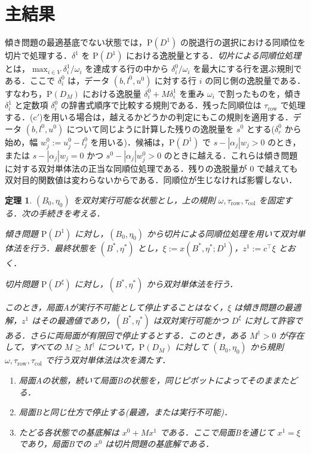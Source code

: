 \documentclass[11pt,a4paper]{ltjsarticle}
\theoremstyle{plain}
\newtheorem{theorem}{定理}
\theoremstyle{definition}
\theoremstyle{remark}
\newcommand{\Pb}{\mathrm{P}}
\begin{document}
\section{主結果}
\label{sec:main}

傾き問題の最適基底でない状態では，$\Pb(D^1)$ の脱退行の選択における同順位を切片で処理する．$\delta^1$ を $\Pb(D^1)$ における逸脱量とする．\emph{切片による同順位処理}とは，$\max_{i\in V}\delta_i^1/\omega_i$ を達成する行の中から $\delta_i^0/\omega_i$ を最大にする行を選ぶ規則である．ここで $\delta_i^0$ は，データ $(b,l^0,u^0)$ に対する行 $i$ の同じ側の逸脱量である．すなわち，$\Pb(D_M)$ における逸脱量 $\delta^0_i+M\delta^1_i$ を重み $\omega_i$ で割ったものを，傾き $\delta^1_i$ と定数項 $\delta^0_i$ の辞書式順序で比較する規則である．残った同順位は $\tau_{\mathrm{row}}$ で処理する．(c$'$)を用いる場合は，越えるかどうかの判定にもこの規則を適用する．データ $(b,l^0,u^0)$ について同じように計算した残りの逸脱量を $s^0$ とする($\delta^0_r$ から始め，幅 $w^0_j:=u^0_j-l^0_j$ を用いる)．候補は，$\Pb(D^1)$ で $s-|\alpha_j|w_j>0$ のとき，または $s-|\alpha_j|w_j=0$ かつ $s^0-|\alpha_j|w^0_j>0$ のときに越える．これらは傾き問題に対する双対単体法の正当な同順位処理である．残りの逸脱量が $0$ で越えても双対目的関数値は変わらないからである．同順位が生じなければ影響しない．

\begin{theorem}
\label{thm:main}
$(B_0,\eta_0)$ を双対実行可能な状態とし，上の規則 $\omega,\tau_{\mathrm{row}},\tau_{\mathrm{col}}$ を固定する．次の手続きを考える．
\begin{description}[leftmargin=1em]
\item[局面A．] 傾き問題 $\Pb(D^1)$ に対し，$(B_0,\eta_0)$ から切片による同順位処理を用いて双対単体法を行う．最終状態を $(B^\ast,\eta^\ast)$ とし，$\xi:=x(B^\ast,\eta^\ast;D^1)$，$z^1:=c^\top\xi$ とおく．
\item[局面B．] 切片問題 $\Pb(D^\xi)$ に対し，$(B^\ast,\eta^\ast)$ から双対単体法を行う．
\end{description}
このとき，局面Aが実行不可能として停止することはなく，$\xi$ は傾き問題の最適解，$z^1$ はその最適値であり，$(B^\ast,\eta^\ast)$ は双対実行可能かつ $D^\xi$ に対して許容である．さらに両局面が有限回で停止するとする．このとき，ある $M^\dagger>0$ が存在して，すべての $M\ge M^\dagger$ について，$\Pb(D_M)$ に対して $(B_0,\eta_0)$ から規則 $\omega,\tau_{\mathrm{row}},\tau_{\mathrm{col}}$ で行う双対単体法は次を満たす．
\begin{enumerate}[label=(\roman*)]
\item 局面Aの状態，続いて局面Bの状態を，同じピボットによってそのままたどる．
\item 局面Bと同じ仕方で停止する(最適，または実行不可能)．
\item たどる各状態での基底解は $x^0+Mx^1$ である．ここで局面Bを通じて $x^1=\xi$ であり，局面Bでの $x^0$ は切片問題の基底解である．
\end{enumerate}
\end{theorem}
\end{document}
